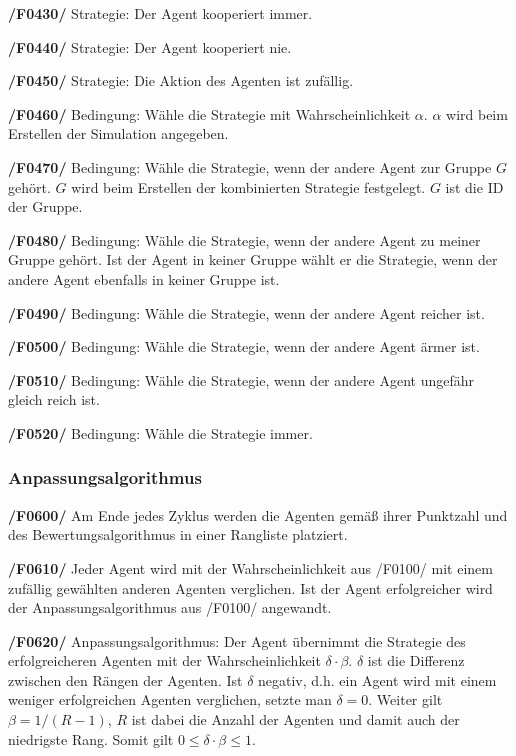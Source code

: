 \textbf{/F0430/} 
Strategie: Der Agent kooperiert immer.

\textbf{/F0440/}
Strategie: Der Agent kooperiert nie.

\textbf{/F0450/}
Strategie: Die Aktion des Agenten ist zufällig.

\textbf{/F0460/}
Bedingung: Wähle die Strategie mit Wahrscheinlichkeit $\alpha$. $\alpha$ wird beim Erstellen der Simulation angegeben.

\textbf{/F0470/}
Bedingung: Wähle die Strategie, wenn der andere Agent zur Gruppe $G$ gehört. $G$ wird beim Erstellen der kombinierten Strategie festgelegt. $G$ ist die ID der Gruppe.

\textbf{/F0480/}
Bedingung: Wähle die Strategie, wenn der andere Agent zu meiner Gruppe gehört. Ist der Agent in keiner Gruppe wählt er die Strategie, wenn der andere Agent ebenfalls in keiner Gruppe ist.

\textbf{/F0490/}
Bedingung: Wähle die Strategie, wenn der andere Agent reicher ist.

\textbf{/F0500/}
Bedingung: Wähle die Strategie, wenn der andere Agent ärmer ist.

\textbf{/F0510/}
Bedingung: Wähle die Strategie, wenn der andere Agent ungefähr gleich reich ist.

\textbf{/F0520/}
Bedingung: Wähle die Strategie immer.

\subsubsection{Anpassungsalgorithmus}

\textbf{/F0600/}
Am Ende jedes Zyklus werden die Agenten gemäß ihrer Punktzahl und des Bewertungsalgorithmus in einer Rangliste platziert.

\textbf{/F0610/}
Jeder Agent wird mit der Wahrscheinlichkeit aus /F0100/ mit einem zufällig gewählten anderen Agenten verglichen. Ist der Agent erfolgreicher wird der Anpassungsalgorithmus aus /F0100/ angewandt.

\textbf{/F0620/}
Anpassungsalgorithmus: Der Agent übernimmt die Strategie des erfolgreicheren Agenten mit der Wahrscheinlichkeit $\delta \cdot \beta$. $\delta$ ist die Differenz zwischen den Rängen der Agenten. {\color{red} Ist $\delta$ negativ, d.h. ein Agent wird mit einem weniger erfolgreichen Agenten verglichen, setzte man $\delta = 0$. Weiter gilt $\beta = 1/(R-1)$, $R$ ist dabei die Anzahl der Agenten und damit auch der niedrigste Rang. Somit gilt $0 \leq \delta \cdot \beta \leq 1$.} 

